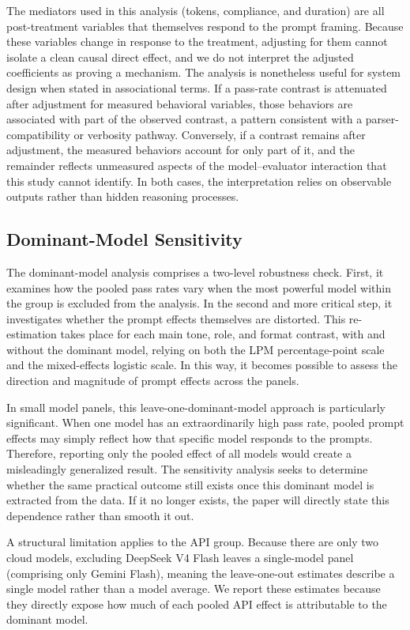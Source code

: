 \documentclass{llncs}
\begin{document}
The mediators used in this analysis (tokens, compliance, and duration) are all post-treatment variables that themselves respond to the prompt framing. Because these variables change in response to the treatment, adjusting for them cannot isolate a clean causal direct effect, and we do not interpret the adjusted coefficients as proving a mechanism. The analysis is nonetheless useful for system design when stated in associational terms. If a pass-rate contrast is attenuated after adjustment for measured behavioral variables, those behaviors are associated with part of the observed contrast, a pattern consistent with a parser-compatibility or verbosity pathway. Conversely, if a contrast remains after adjustment, the measured behaviors account for only part of it, and the remainder reflects unmeasured aspects of the model--evaluator interaction that this study cannot identify. In both cases, the interpretation relies on observable outputs rather than hidden reasoning processes.

\subsection{Dominant-Model Sensitivity}\label{dominant-model-sensitivity}

The dominant-model analysis comprises a two-level robustness check. First, it examines how the pooled pass rates vary when the most powerful model within the group is excluded from the analysis. In the second and more critical step, it investigates whether the prompt effects themselves are distorted. This re-estimation takes place for each main tone, role, and format contrast, with and without the dominant model, relying on both the LPM percentage-point scale and the mixed-effects logistic scale. In this way, it becomes possible to assess the direction and magnitude of prompt effects across the panels.

In small model panels, this leave-one-dominant-model approach is particularly significant. When one model has an extraordinarily high pass rate, pooled prompt effects may simply reflect how that specific model responds to the prompts. Therefore, reporting only the pooled effect of all models would create a misleadingly generalized result. The sensitivity analysis seeks to determine whether the same practical outcome still exists once this dominant model is extracted from the data. If it no longer exists, the paper will directly state this dependence rather than smooth it out.

A structural limitation applies to the API group. Because there are only two cloud models, excluding DeepSeek V4 Flash leaves a single-model panel (comprising only Gemini Flash), meaning the leave-one-out estimates describe a single model rather than a model average. We report these estimates because they directly expose how much of each pooled API effect is attributable to the dominant model.
\end{document}
